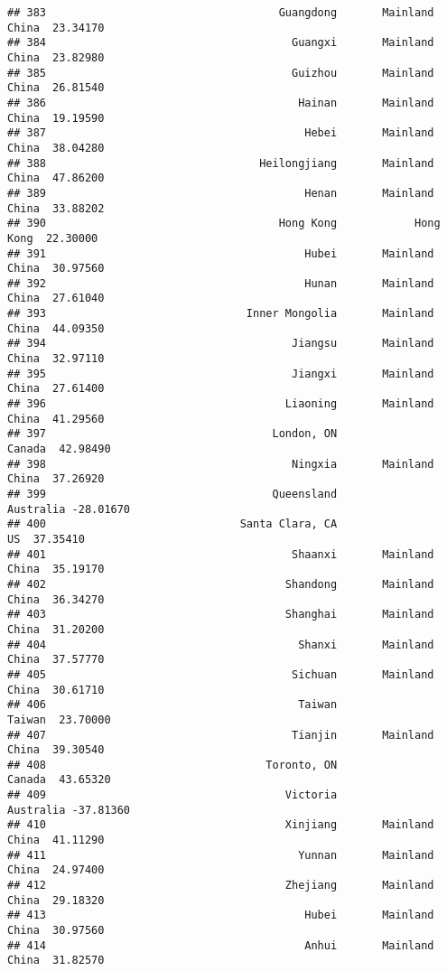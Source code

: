 \documentclass[
]{article}
\begin{document}
\begin{verbatim}
## 383                                    Guangdong       Mainland China  23.34170
## 384                                      Guangxi       Mainland China  23.82980
## 385                                      Guizhou       Mainland China  26.81540
## 386                                       Hainan       Mainland China  19.19590
## 387                                        Hebei       Mainland China  38.04280
## 388                                 Heilongjiang       Mainland China  47.86200
## 389                                        Henan       Mainland China  33.88202
## 390                                    Hong Kong            Hong Kong  22.30000
## 391                                        Hubei       Mainland China  30.97560
## 392                                        Hunan       Mainland China  27.61040
## 393                               Inner Mongolia       Mainland China  44.09350
## 394                                      Jiangsu       Mainland China  32.97110
## 395                                      Jiangxi       Mainland China  27.61400
## 396                                     Liaoning       Mainland China  41.29560
## 397                                   London, ON               Canada  42.98490
## 398                                      Ningxia       Mainland China  37.26920
## 399                                   Queensland            Australia -28.01670
## 400                              Santa Clara, CA                   US  37.35410
## 401                                      Shaanxi       Mainland China  35.19170
## 402                                     Shandong       Mainland China  36.34270
## 403                                     Shanghai       Mainland China  31.20200
## 404                                       Shanxi       Mainland China  37.57770
## 405                                      Sichuan       Mainland China  30.61710
## 406                                       Taiwan               Taiwan  23.70000
## 407                                      Tianjin       Mainland China  39.30540
## 408                                  Toronto, ON               Canada  43.65320
## 409                                     Victoria            Australia -37.81360
## 410                                     Xinjiang       Mainland China  41.11290
## 411                                       Yunnan       Mainland China  24.97400
## 412                                     Zhejiang       Mainland China  29.18320
## 413                                        Hubei       Mainland China  30.97560
## 414                                        Anhui       Mainland China  31.82570

\end{verbatim}
\end{document}
